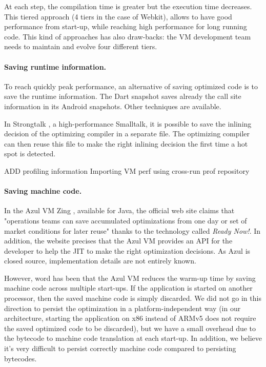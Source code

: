 \documentclass[a4paper,12pt,twoside]{../includes/ThesisStyle}
\begin{document}
At each step, the compilation time is greater but the execution time decreases. This tiered approach (4 tiers in the case of Webkit), allows to have good performance from start-up, while reaching high performance for long running code. This kind of approaches has also draw-backs: the VM development team needs to maintain and evolve four different tiers.

\paragraph{Saving runtime information.}

To reach quickly peak performance, an alternative of saving optimized code is to save the runtime information. The Dart snapshot saves already the call site information in its Android snapshots. Other techniques are available.

In Strongtalk \cite{Sun06}, a high-performance Smalltalk, it is possible to save the inlining decision of the optimizing compiler in a separate file. The optimizing compiler can then reuse this file to make the right inlining decision the first time a hot spot is detected.

ADD
profiling information
Importing VM perf using cross-run prof repository \cite{Arno05c}

\paragraph{Saving machine code.}

In the Azul VM Zing \cite{Azul}, available for Java, the official web site claims that "operations teams can save accumulated optimizations from one day or set of market conditions for later reuse" thanks to the technology called \emph{Ready Now!}. In addition, the website precises that the Azul VM provides an API for the developer to help the JIT to make the right optimization decisions. As Azul is closed source, implementation details are not entirely known. 

However, word has been that the Azul VM reduces the warm-up time by saving machine code across multiple start-ups. If the application is started on another processor, then the saved machine code is simply discarded. We did not go in this direction to persist the optimization in a platform-independent way (in our architecture, starting the application on x86 instead of ARMv5 does not require the saved optimized code to be discarded), but we have a small overhead due to the bytecode to machine code translation at each start-up. In addition, we believe it's very difficult to persist correctly machine code compared to persisting bytecodes.
\end{document}
